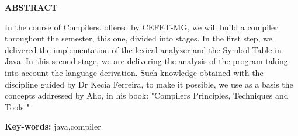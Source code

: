 \begin{center}
\uppercase{\textbf{\large{Abstract}}}
\end{center}
In the course of Compilers, offered by CEFET-MG, we will build a compiler throughout the semester, this one, divided into stages. In the first step, we delivered the implementation of the lexical analyzer and the Symbol Table in Java. In this second stage, we are delivering the analysis of the program taking into account the language derivation. Such knowledge obtained with the discipline guided by Dr Kecia Ferreira, to make it possible, we use as a basis the concepts addressed by Aho, in his book: "Compilers Principles, Techniques and Tools "
\vspace{5cm}

\textbf{Key-words:} java,compiler

\clearpage